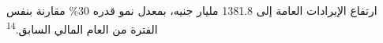 ارتفاع الإيرادات العامة إلى 1381.8 مليار جنيه، بمعدل نمو قدره 30\% مقارنة بنفس الفترة من العام المالي السابق.\textsuperscript{14}
